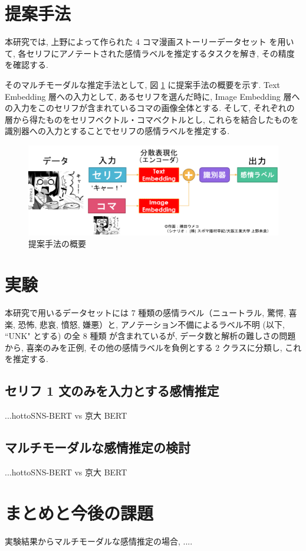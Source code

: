 \documentclass[a4paper,twoside,twocolumn,10pt]{jarticle}     %
\begin{document}
\section{提案手法}
本研究では, 上野によって作られた 4 コマ漫画ストーリーデータセット \cite{ueno_miki2018} を用いて,
各セリフにアノテートされた感情ラベルを推定するタスクを解き, その精度を確認する.

そのマルチモーダルな推定手法として, 図 \ref{fig:teian} に提案手法の概要を示す.
Text Embedding 層への入力として, あるセリフを選んだ時に, Image Embedding 層への入力をこのセリフが含まれているコマの画像全体とする. そして, それぞれの層から得たものをセリフベクトル・コマベクトルとし, これらを結合したものを識別器への入力とすることでセリフの感情ラベルを推定する.

\begin{figure}[!th]
  \centering
  \includegraphics[scale=0.35]{teian.png}
  \caption{提案手法の概要}
  \label{fig:teian}
\end{figure}
\section{実験}
本研究で用いるデータセットには 7 種類の感情ラベル（ニュートラル, 驚愕, 喜楽, 恐怖, 悲哀, 憤怒, 嫌悪）と, アノテーション不備によるラベル不明 (以下, ``UNK" とする) の全 8 種類
が含まれているが, データ数と解析の難しさの問題から, 喜楽のみを正例, その他の感情ラベルを負例とする 2 クラスに分類し, これを推定する.
\subsection{セリフ 1 文のみを入力とする感情推定}
...hottoSNS-BERT vs 京大 BERT
\subsection{マルチモーダルな感情推定の検討}
...hottoSNS-BERT vs 京大 BERT

\section{まとめと今後の課題}
実験結果からマルチモーダルな感情推定の場合, ....
\end{document}
